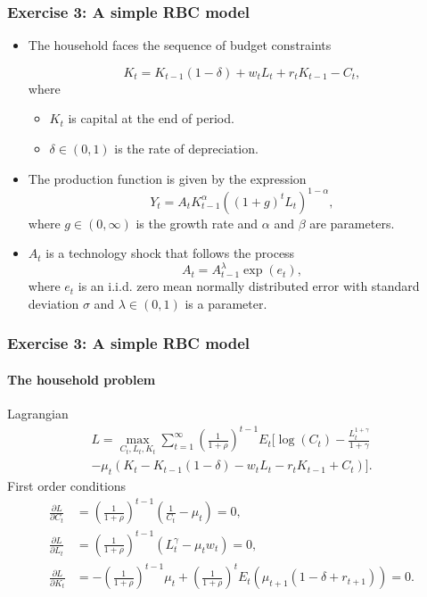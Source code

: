 \documentclass{beamer} %
\begin{document}
\begin{frame}
  \frametitle{Exercise 3: A simple RBC model}

\begin{itemize}
\item The household faces the sequence of budget constraints

\begin{equation*}
K_t=K_{t-1}\left( 1-\delta \right) +w_{t}L_{t}+r_{t}K_{t-1}-C_{t},
\end{equation*}%
where
\begin{itemize}
\item $K_{t}$ is capital at the end of period.
\item $\delta \in \left(
0,1\right) $ is the rate of depreciation.
\end{itemize}
\item The production function is given by the expression%
\begin{equation*}
Y_{t}=A_{t}K_{t-1}^{\alpha }\left( \left( 1+g\right) ^{t}L_{t}\right) ^{1-\alpha},
\end{equation*}%
where $g\in \left( 0,\infty \right) $ is the growth rate and $\alpha $ and $%
\beta $ are parameters.
\item $A_{t}$ is a technology shock that follows the
process%
\begin{equation*}
A_{t}=A_{t-1}^{\lambda }\exp \left( e_{t}\right) ,
\end{equation*}%
where $e_{t}$ is an i.i.d. zero mean normally distributed error with
standard deviation $\sigma$ and $\lambda \in \left( 0,1\right) $ is a
parameter.
\end{itemize}
\end{frame}

\begin{frame}  \frametitle{Exercise 3: A simple RBC model}
  \framesubtitle{The household problem}
  Lagrangian
\begin{multline*}
L = \max_{C_t,L_t,K_t} \sum_{t=1}^\infty \left( \frac{1}{1+\rho }\right) ^{t-1}E_{t}\Big[ \log
\left( C_{t}\right) -\frac{L_{t}^{1+\gamma }}{1+\gamma }\\
-\mu_t\left(K_t-K_{t-1}\left( 1-\delta \right) -w_{t}L_{t}-r_{t}K_{t-1}+C_{t}\right)\Big].
\end{multline*}
First order conditions
\begin{align*}
  \frac{\partial L}{\partial C_t} &= \left( \frac{1}{1+\rho }\right) ^{t-1}\left(\frac{1}{C_t}-\mu_t\right) = 0,\\
  \frac{\partial L}{\partial L_t} &= \left( \frac{1}{1+\rho }\right) ^{t-1}\left(L_t^\gamma-\mu_tw_t\right) = 0,\\
  \frac{\partial L}{\partial K_t} &= -\left( \frac{1}{1+\rho }\right) ^{t-1}\mu_t+\left( \frac{1}{1+\rho }\right) ^tE_t\left(\mu_{t+1}(1-\delta+r_{t+1})\right) = 0.
\end{align*}
\end{frame}
\end{document}
